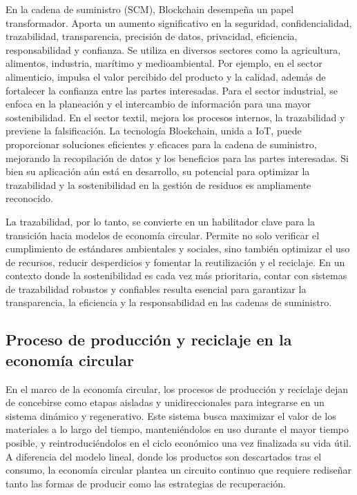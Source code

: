 En la cadena de suministro (SCM), Blockchain desempeña un papel transformador. Aporta un aumento significativo en la seguridad, confidencialidad, trazabilidad, transparencia, precisión de datos, privacidad, eficiencia, responsabilidad y confianza. Se utiliza en diversos sectores como la agricultura, alimentos, industria, marítimo y medioambiental. Por ejemplo, en el sector alimenticio, impulsa el valor percibido del producto y la calidad, además de fortalecer la confianza entre las partes interesadas. Para el sector industrial, se enfoca en la planeación y el intercambio de información para una mayor sostenibilidad. En el sector textil, mejora los procesos internos, la trazabilidad y previene la falsificación. La tecnología Blockchain, unida a IoT, puede proporcionar soluciones eficientes y eficaces para la cadena de suministro, mejorando la recopilación de datos y los beneficios para las partes interesadas. Si bien su aplicación aún está en desarrollo, su potencial para optimizar la trazabilidad y la sostenibilidad en la gestión de residuos es ampliamente reconocido.

La trazabilidad, por lo tanto, se convierte en un habilitador clave para la transición hacia modelos de economía circular. Permite no solo verificar el cumplimiento de estándares ambientales y sociales, sino también optimizar el uso de recursos, reducir desperdicios y fomentar la reutilización y el reciclaje. En un contexto donde la sostenibilidad es cada vez más prioritaria, contar con sistemas de trazabilidad robustos y confiables resulta esencial para garantizar la transparencia, la eficiencia y la responsabilidad en las cadenas de suministro.

\subsection{Proceso de producción y reciclaje en la economía circular}

En el marco de la economía circular, los procesos de producción y reciclaje dejan de concebirse como etapas aisladas y unidireccionales para integrarse en un sistema dinámico y regenerativo. Este sistema busca maximizar el valor de los materiales a lo largo del tiempo, manteniéndolos en uso durante el mayor tiempo posible, y reintroduciéndolos en el ciclo económico una vez finalizada su vida útil. A diferencia del modelo lineal, donde los productos son descartados tras el consumo, la economía circular plantea un circuito continuo que requiere rediseñar tanto las formas de producir como las estrategias de recuperación.

